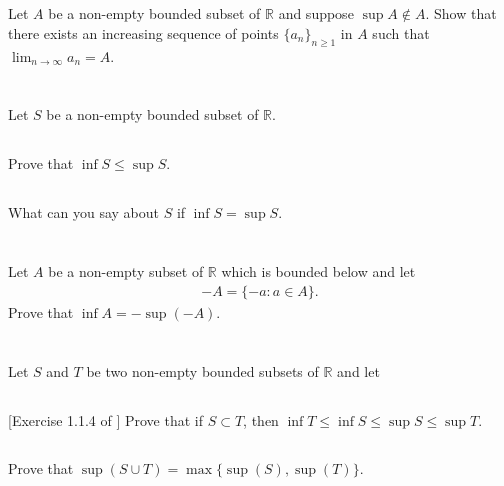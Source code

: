 \documentclass[11pt,letterpaper]{article}
\begin{document}
\section{}
Let $A$ be a non-empty bounded subset of $\mathbb{R}$ and suppose $\sup A \notin A$. Show that there exists an increasing sequence of points $\{a_n\}_{n\geq 1}$ in $A$ such that $\lim_{n\to\infty} a_n = A$.

\section{}
Let $S$ be a non-empty bounded subset of $\mathbb{R}$.
\subsection{} Prove that $\inf S\leq \sup S$.
\subsection{} What can you say about $S$ if $\inf S= \sup S$.

\section{}
Let $A$ be a non-empty subset of $\mathbb{R}$ which is bounded below and let
\begin{align}
    -A = \{-a:a\in A\}.
\end{align}
Prove that $\inf A = -\sup(-A)$.

\section{}
Let $S$ and $T$ be two non-empty bounded subsets of $\mathbb{R}$ and let

\subsection{} [Exercise 1.1.4 of \cite{Lebl_23}] Prove that if $S \subset T$, then $\inf T \leq \inf S \leq \sup S \leq \sup T$.

\subsection{} Prove that $\sup(S\cup T) = \max\{\sup(S),\sup(T)\}$. 

\section{}
\end{document}
